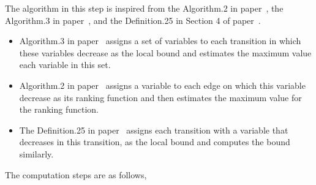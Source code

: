 The algorithm in this step is inspired from the Algorithm.2 in paper~\cite{SinnZV14},
the Algorithm.3 in paper~\cite{ZulegerGSV11},
and the Definition.25 in Section 4 of paper~\cite{sinn2017complexity}.
\begin{itemize}
\item Algorithm.3 in paper~\cite{ZulegerGSV11} assigns a set of variables to each transition in which these variables decrease as the local bound
and estimates the maximum value each variable in this set.
\item Algorithm.2 in paper~\cite{SinnZV14} assigns a variable to each edge on which this variable decrease as its ranking function
and then estimates the maximum value for the ranking function.
\item The Definition.25 in paper~\cite{sinn2017complexity}
assigns each transition with a variable that decreases in this transition, as the local bound and computes the bound similarly.
\end{itemize}
%
The computation steps are as follows,
